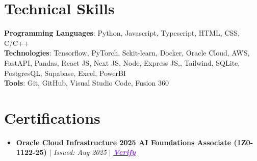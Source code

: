 \documentclass[a4paper,11pt]{article}
\newcommand{\resumeItem}[1]{
  \item\small{
    {#1 \vspace{-2pt}}
  }
}
\newcommand{\resumeItemListStart}{\begin{itemize}[leftmargin=0.15in, nosep]}
\newcommand{\resumeItemListEnd}{\end{itemize}\vspace{-2pt}}
\begin{document}
\vspace{-10pt}
\section{\Large{Technical Skills}}
 \begin{itemize}[leftmargin=0.15in, label={}]
    \small{\item{
     \textbf{Programming Languages}{: Python, Javascript, Typescript, HTML, CSS, C/C++} \\
     \textbf{Technologies}{: Tensorflow, PyTorch, Sckit-learn, Docker, Oracle Cloud, AWS, FastAPI, Pandas, React JS, Next JS, Node, Express JS,, Tailwind, SQLite, PostgresQL, Supabase, Excel, PowerBI}  \\
     \textbf{Tools}{: Git, GitHub, Visual Studio Code, Fusion 360} \\
    }}
 \end{itemize}

 \vspace{-12pt}
\section{Certifications}
  \resumeItemListStart
    \resumeItem{\textbf{Oracle Cloud Infrastructure 2025 AI Foundations Associate (1Z0-1122-25)} $|$ \emph{Issued: Aug 2025} $|$ \emph{\href{https://catalog-education.oracle.com/ords/certview/sharebadge?id=82DB04BF7EB36ECBDCA3D64DA0C3B78B4FB0EE3FA8CCDFA68535B8FD8F7AC230}{\textcolor{BlueViolet}{\textbf{Verify}}}}}
  \resumeItemListEnd
\end{document}
